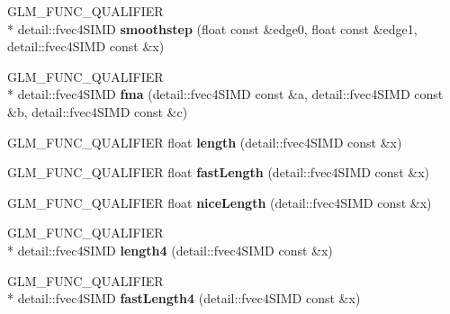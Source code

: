 \begin{DoxyCompactItemize}
\item 
\hypertarget{namespaceglm_a38415c03c75a84267151b370d866e42e}{G\-L\-M\-\_\-\-F\-U\-N\-C\-\_\-\-Q\-U\-A\-L\-I\-F\-I\-E\-R \\*
detail\-::fvec4\-S\-I\-M\-D {\bfseries smoothstep} (float const \&edge0, float const \&edge1, detail\-::fvec4\-S\-I\-M\-D const \&x)}\label{namespaceglm_a38415c03c75a84267151b370d866e42e}

\item 
\hypertarget{namespaceglm_a3dd47df42a32adc14c604bed47633830}{G\-L\-M\-\_\-\-F\-U\-N\-C\-\_\-\-Q\-U\-A\-L\-I\-F\-I\-E\-R \\*
detail\-::fvec4\-S\-I\-M\-D {\bfseries fma} (detail\-::fvec4\-S\-I\-M\-D const \&a, detail\-::fvec4\-S\-I\-M\-D const \&b, detail\-::fvec4\-S\-I\-M\-D const \&c)}\label{namespaceglm_a3dd47df42a32adc14c604bed47633830}

\item 
\hypertarget{namespaceglm_a65aff7dc68102a01ec2746d2c0c733c7}{G\-L\-M\-\_\-\-F\-U\-N\-C\-\_\-\-Q\-U\-A\-L\-I\-F\-I\-E\-R float {\bfseries length} (detail\-::fvec4\-S\-I\-M\-D const \&x)}\label{namespaceglm_a65aff7dc68102a01ec2746d2c0c733c7}

\item 
\hypertarget{namespaceglm_ae8fababc16f402b8e518982eb08284ef}{G\-L\-M\-\_\-\-F\-U\-N\-C\-\_\-\-Q\-U\-A\-L\-I\-F\-I\-E\-R float {\bfseries fast\-Length} (detail\-::fvec4\-S\-I\-M\-D const \&x)}\label{namespaceglm_ae8fababc16f402b8e518982eb08284ef}

\item 
\hypertarget{namespaceglm_a34a9cfc7cf7fe9b35911cc3013033e61}{G\-L\-M\-\_\-\-F\-U\-N\-C\-\_\-\-Q\-U\-A\-L\-I\-F\-I\-E\-R float {\bfseries nice\-Length} (detail\-::fvec4\-S\-I\-M\-D const \&x)}\label{namespaceglm_a34a9cfc7cf7fe9b35911cc3013033e61}

\item 
\hypertarget{namespaceglm_a9de224e4659dd8df0f6cbfe87785ad37}{G\-L\-M\-\_\-\-F\-U\-N\-C\-\_\-\-Q\-U\-A\-L\-I\-F\-I\-E\-R \\*
detail\-::fvec4\-S\-I\-M\-D {\bfseries length4} (detail\-::fvec4\-S\-I\-M\-D const \&x)}\label{namespaceglm_a9de224e4659dd8df0f6cbfe87785ad37}

\item 
\hypertarget{namespaceglm_a07438f3a62641a379456e932dd97b090}{G\-L\-M\-\_\-\-F\-U\-N\-C\-\_\-\-Q\-U\-A\-L\-I\-F\-I\-E\-R \\*
detail\-::fvec4\-S\-I\-M\-D {\bfseries fast\-Length4} (detail\-::fvec4\-S\-I\-M\-D const \&x)}\label{namespaceglm_a07438f3a62641a379456e932dd97b090}


\end{DoxyCompactItemize}
